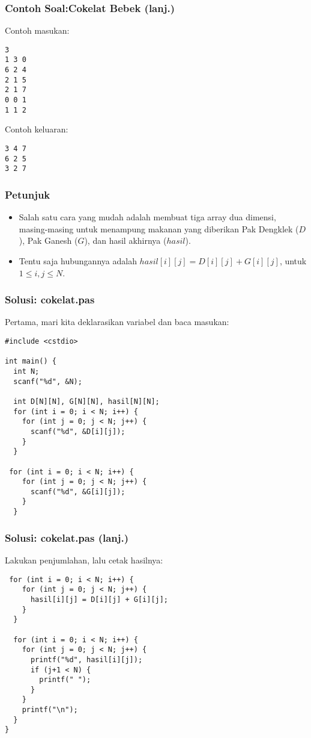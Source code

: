 \begin{frame}[fragile]
\frametitle{Contoh Soal:\newline Cokelat Bebek (lanj.)}
Contoh masukan:
\begin{lstlisting}
3
1 3 0
6 2 4
2 1 5
2 1 7
0 0 1
1 1 2
\end{lstlisting}

\hfill

Contoh keluaran:
\begin{lstlisting}
3 4 7
6 2 5
3 2 7
\end{lstlisting}
\end{frame}

\begin{frame}
\frametitle{Petunjuk}
\begin{itemize}
  \item Salah satu cara yang mudah adalah membuat tiga array dua dimensi, masing-masing untuk menampung makanan yang diberikan Pak Dengklek ($D$), Pak Ganesh ($G$), dan hasil akhirnya ($hasil$).
  \item Tentu saja hubungannya adalah $hasil[i][j] = D[i][j] + G[i][j]$, untuk $1 \le i,j \le N$.
\end{itemize}
\end{frame}

\begin{frame}[fragile]
\frametitle{Solusi: cokelat.pas}
Pertama, mari kita deklarasikan variabel dan baca masukan:
\begin{lstlisting}
#include <cstdio>

int main() {
  int N;
  scanf("%d", &N);

  int D[N][N], G[N][N], hasil[N][N];
  for (int i = 0; i < N; i++) {
    for (int j = 0; j < N; j++) {
      scanf("%d", &D[i][j]);
    }
  }

 for (int i = 0; i < N; i++) {
    for (int j = 0; j < N; j++) {
      scanf("%d", &G[i][j]);
    }
  }
\end{lstlisting}
\end{frame}

\begin{frame}[fragile]
\frametitle{Solusi: cokelat.pas (lanj.)}
Lakukan penjumlahan, lalu cetak hasilnya:
\begin{lstlisting}
 for (int i = 0; i < N; i++) {
    for (int j = 0; j < N; j++) {
      hasil[i][j] = D[i][j] + G[i][j];
    }
  }

  for (int i = 0; i < N; i++) {
    for (int j = 0; j < N; j++) {
      printf("%d", hasil[i][j]);
      if (j+1 < N) {
        printf(" ");
      }
    }
    printf("\n");
  }
}
\end{lstlisting}
\end{frame}

